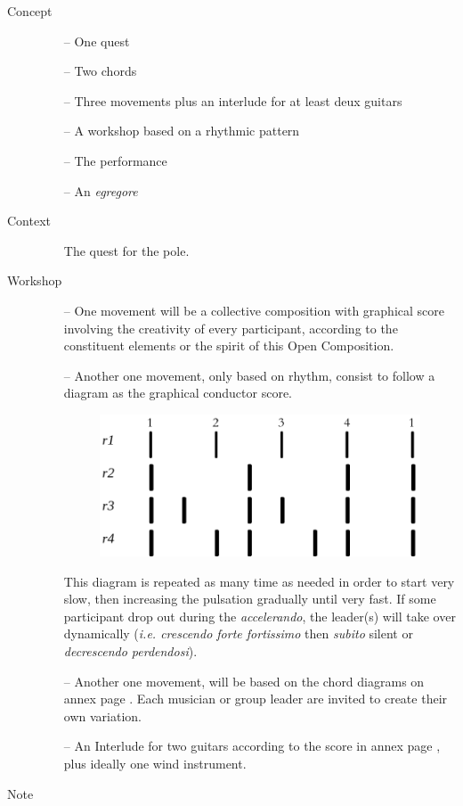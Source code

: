 \begin{description}
\item[Concept] \hfill 
\begin{itemize}
\item[--] One quest
\item[--] Two chords
\item[--] Three movements plus an interlude for at least deux guitars
\item[--] A workshop based on a rhythmic pattern
\item[--] The performance
\item[--] An \textit{egregore}
\end{itemize}
\bigskip
\item[Context] \hfill 
\begin{itemize}
\item[] The quest for the pole.
\end{itemize}
\bigskip
\item[Workshop] \hfill 
\begin{itemize}
\item[--] One movement will be a collective composition with graphical score involving the creativity of every participant, according to the constituent elements or the spirit of this Open Composition.  
\item[--] Another one movement, only based on rhythm, consist to follow a diagram as the graphical conductor score. 
 \begin{figure}[H]
\begin{center}
\includegraphics[scale=0.3]{img/nrtm}
\end{center}
\end{figure}
This diagram %
is repeated as many time as needed in order to start very slow, then increasing the pulsation gradually until very fast. If some participant drop out during the \textit{accelerando}, the leader(s) will take over dynamically (\textit{i.e. crescendo forte fortissimo} then \textit{subito} silent or \textit{decrescendo perdendosi}).
\item[--] Another one movement, will be based on the chord diagrams on annex page \pageref{oco2}. Each musician or group leader are invited to create their own variation.
\item[--] An Interlude for two guitars according to the score in annex page \pageref{interlude}, plus ideally one wind instrument.
\end{itemize}
\bigskip
\item[Note] \hfill 


\end{description}
